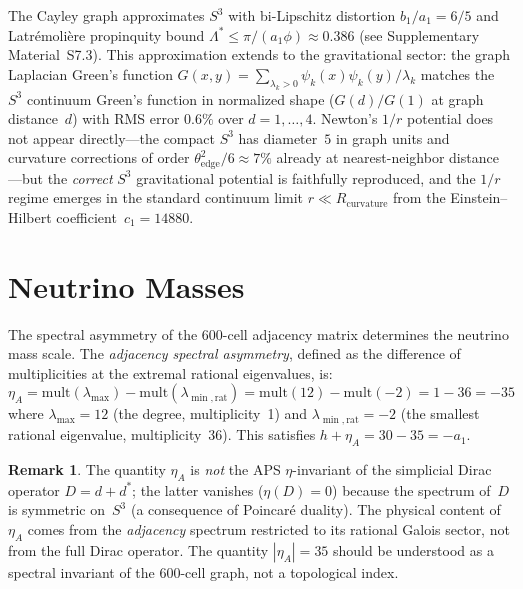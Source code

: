 \documentclass[12pt,a4paper]{article}
\theoremstyle{definition}
\newtheorem{remark}{Remark}
\begin{document}
The Cayley graph approximates $S^3$ with bi-Lipschitz distortion $b_1/a_1 = 6/5$ and Latr\'emoli\`ere propinquity bound $\Lambda^* \leq \pi/(a_1\phi) \approx 0.386$ (see Supplementary Material~S7.3).  This approximation extends to the gravitational sector: the graph Laplacian Green's function $G(x,y) = \sum_{\lambda_k > 0} \psi_k(x)\psi_k(y)/\lambda_k$ matches the $S^3$ continuum Green's function in normalized shape ($G(d)/G(1)$ at graph distance~$d$) with RMS error $0.6\%$ over $d = 1, \ldots, 4$.  Newton's $1/r$ potential does not appear directly---the compact $S^3$ has diameter~$5$ in graph units and curvature corrections of order $\theta_{\mathrm{edge}}^2/6 \approx 7\%$ already at nearest-neighbor distance---but the \emph{correct} $S^3$ gravitational potential is faithfully reproduced, and the $1/r$ regime emerges in the standard continuum limit $r \ll R_{\mathrm{curvature}}$ from the Einstein--Hilbert coefficient~$c_1 = 14880$.

\section{Neutrino Masses}
\label{sec:neutrinos}

The spectral asymmetry of the 600-cell adjacency matrix determines the neutrino mass scale. The \emph{adjacency spectral asymmetry}, defined as the difference of multiplicities at the extremal rational eigenvalues, is:
\begin{equation}
\eta_A = \text{mult}(\lambda_{\max}) - \text{mult}(\lambda_{\min,\text{rat}}) = \text{mult}(12) - \text{mult}(-2) = 1 - 36 = -35
\end{equation}
where $\lambda_{\max} = 12$ (the degree, multiplicity~1) and $\lambda_{\min,\text{rat}} = -2$ (the smallest rational eigenvalue, multiplicity~36).  This satisfies $h + \eta_A = 30 - 35 = -a_1$.

\begin{remark}
The quantity $\eta_A$ is \emph{not} the APS $\eta$-invariant of the simplicial Dirac operator $D = d + d^*$; the latter vanishes ($\eta(D) = 0$) because the spectrum of~$D$ is symmetric on~$S^3$ (a consequence of Poincar\'e duality).  The physical content of~$\eta_A$ comes from the \emph{adjacency} spectrum restricted to its rational Galois sector, not from the full Dirac operator.  The quantity $|\eta_A| = 35$ should be understood as a spectral invariant of the 600-cell graph, not a topological index.
\end{remark}
\end{document}
